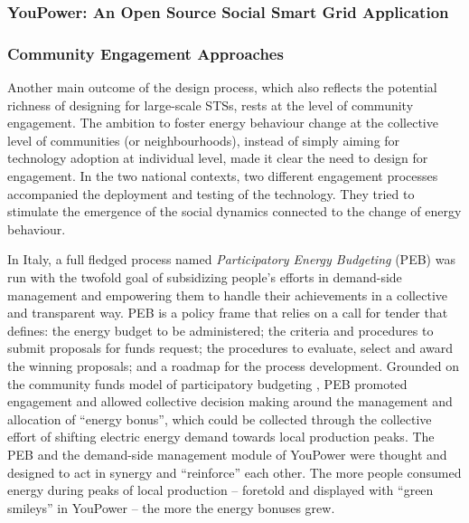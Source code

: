 \cite{Huang2017}

\subsubsection{YouPower: An Open Source Social Smart Grid Application} %





\subsubsection{Community Engagement Approaches} %

Another main outcome of the design process, which also reflects the potential richness of designing for large-scale STSs, rests at the level of community engagement. %
The ambition to foster energy behaviour change at the collective level of communities (or neighbourhoods),
instead of simply aiming for technology adoption at individual level, made it clear the need to design for
engagement.
% 
In the two national contexts, two different engagement processes accompanied the deployment and testing of the technology. They tried to stimulate the emergence of the social dynamics connected to the change of energy behaviour. 

In Italy, a full fledged process named \textit{Participatory Energy Budgeting} (PEB) \cite{capaccioli_exploring_2017,capaccioli_exploring_2016}
was run with the twofold goal of subsidizing people's efforts in demand-side management
and empowering them to handle their achievements in a collective and transparent way.
%
PEB is a policy frame that relies on a call for tender that
defines: the energy budget to be administered;
the criteria and procedures to submit proposals for funds request; the procedures
to evaluate, select and award the winning proposals; and a roadmap for the process development. 
Grounded on the community funds model of participatory budgeting \cite{Ganuza2012,Sintomer2008},
PEB promoted engagement and allowed collective decision
making around the management and allocation of ``energy bonus'', which could be
collected through the collective effort of shifting electric energy demand
towards local production peaks.
% 
The PEB and the demand-side management module of YouPower
were thought and designed to act in synergy and ``reinforce'' each other.
The more people consumed energy during peaks of local production -- foretold and displayed
with ``green smileys'' in YouPower -- the more the energy bonuses grew.

